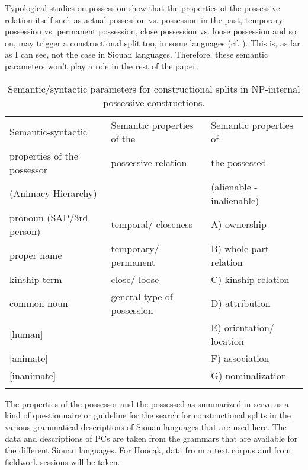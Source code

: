 \documentclass[output=paper]{LSP/langsci}
\begin{document}
Typological studies on possession show that the properties of the possessive relation itself such as actual possession vs. possession in the past, temporary possession vs. permanent possession, close possession vs. loose possession and so on, may trigger a constructional split too, in some languages (cf. \citealt[274--276]{Dixon2010}). This is, as far as I can see, not the case in Siouan languages. Therefore, these semantic parameters won't play a role in the rest of the paper. 

\begin{table}
\caption{Semantic/syntactic parameters for constructional splits in NP-internal possessive constructions.} \label{parameters}
\small
\begin{tabular}[h]{ l l l }

\lsptoprule
Semantic-syntactic &	Semantic properties of the & Semantic properties of \\
properties of the possessor & possessive relation &  the possessed \\

(Animacy Hierarchy) & & (alienable - inalienable) \\
\midrule
pronoun (SAP/3rd person) & temporal/ closeness & A) ownership \\
 
proper name & temporary/ permanent & B) whole-part relation \\
 
kinship term & close/ loose & C) kinship relation \\
 
common noun & general type of possession & D) attribution \\
 
{[human]} & & E) orientation/ location \\
 
{[animate]} & & F) association \\
 
{[inanimate]} & & G) nominalization \\
\lspbottomrule
\end{tabular}
\end{table}

The properties of the possessor and the possessed as summarized in  serve as a kind of questionnaire or guideline for the search for constructional splits in the various grammatical descriptions of Siouan languages that are used here. The data and descriptions of PCs are taken from the grammars that are available for the different Siouan languages. For Hoocąk, data fro m a text corpus and from fieldwork sessions will be taken. 
\end{document}
